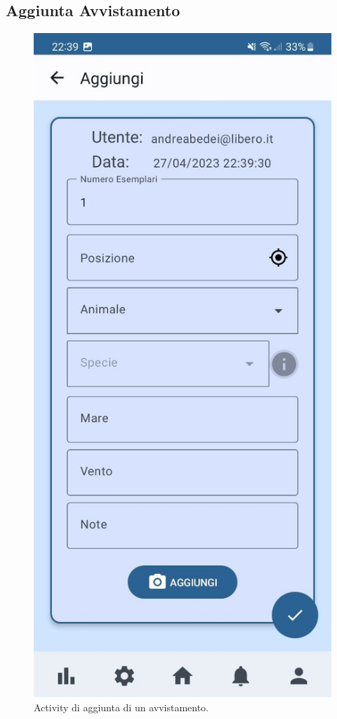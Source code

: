 \documentclass[a4paper,final,12pt]{report}
\begin{document}
\subsection{Aggiunta Avvistamento}
\begin{figure}[hbtp]
\centering
\includegraphics[scale=0.19]{img_concettuale/aggmob.jpg}
\caption{Activity di aggiunta di un avvistamento.}
\end{figure}
\end{document}
